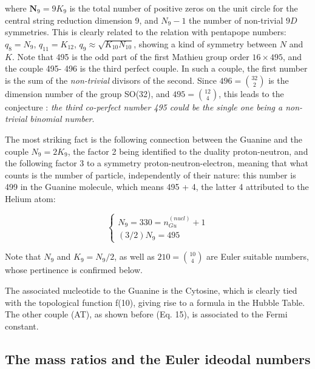 \documentclass[a4paper,9pt]{article}
\begin{document}
where  $\textbf{N}_9 = 9K_9$ is the total number of positive zeros on the unit circle for the central string reduction dimension 9, and $N_{9}-1$ the number of non-trivial $9D$ symmetries. This is clearly related to the relation with pentapope numbers: $ q_8 = N_9$, $q_{11} = K_{12}$, $q_9\approx \sqrt{K_{10} N_{10}}$, showing a kind of symmetry between $N$ and $K$. Note that 495 is the odd part of the first Mathieu group order $16\times495$, and the couple 495- 496 is the third perfect couple. In such a couple, the first number is the sum of the \textit{non-trivial} divisors of the second. Since $496 = \binom{32}{2}$ is the dimension number of the group SO(32), and $495 = \binom{12}{4}$, this leads to the conjecture : \textit{the third co-perfect number 495 could be the single one being a non-trivial binomial number}. 

The most striking fact is the following connection between the Guanine and the couple $N_9= 2K_9$, the factor 2 being identified to the duality proton-neutron, and the following factor 3 to a symmetry proton-neutron-electron, meaning that what counts is the number of particle, independently of their nature: this number is 499 in the Guanine molecule, which means 495 + 4, the latter 4 attributed to the Helium atom:

\begin{equation}\label{Eq26}
 \left\{
    \begin{array}{ll} 
            N_9 = 330 = n_{Gu}^{(nucl)} + 1\\
            (3/2)N_9 = 495 
    \end{array}
\right.
\end{equation}


Note that $N_9$ and $K_9 = N_9/2$, as well as $210 = \binom{10}{4}$ are Euler suitable numbers, whose pertinence is confirmed below.

The associated nucleotide to the Guanine is the Cytosine, which is clearly tied with the topological function f(10), giving rise to a formula in the Hubble Table. The other couple (AT), as shown before (Eq. 15), is associated to the Fermi constant.

 



\subsection{The mass ratios and the Euler ideodal numbers} 
\end{document}
